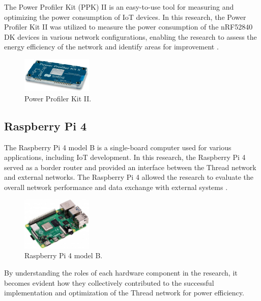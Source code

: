 The Power Profiler Kit (PPK) II is an easy-to-use tool for measuring and optimizing the power consumption of IoT devices. In this research, the Power Profiler Kit II was utilized to measure the power consumption of the nRF52840 DK devices in various network configurations, enabling the research to assess the energy efficiency of the network and identify areas for improvement \cite{Semiconductor_Nordic_PPK_II_2018_1.0}.

\begin{figure}[H]
    \centering
    \includegraphics[width=0.3\textwidth]{images/situational_theoretical_analysis/nRF_Power_Profiler_Kit_II.png}
    \caption{Power Profiler Kit II.}
    \label{fig:nRF_Power_Profiler_Kit_II}
\end{figure}

\subsection{Raspberry Pi 4}

The Raspberry Pi 4 model B is a single-board computer used for various applications, including IoT development. In this research, the Raspberry Pi 4 served as a border router and provided an interface between the Thread network and external networks. The Raspberry Pi 4 allowed the research to evaluate the overall network performance and data exchange with external systems \cite{alm2019internet}.

\begin{figure}[H]
    \centering
    \includegraphics[width=0.3\textwidth]{images/situational_theoretical_analysis/Raspberry_Pi_4.jpg}
    \caption{Raspberry Pi 4 model B.}
    \label{fig:Raspberry_Pi_4}
\end{figure}

By understanding the roles of each hardware component in the research, it becomes evident how they collectively contributed to the successful implementation and optimization of the Thread network for power efficiency.


